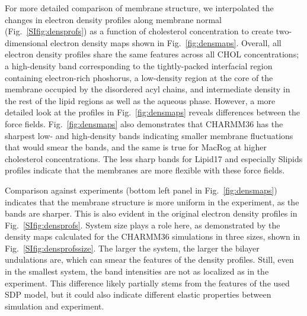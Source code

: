 \documentclass[journal=jctcce]{achemso}
\begin{document}
For more detailed comparison of membrane structure, 
we interpolated the changes in electron density profiles along membrane normal (Fig.~\ref{SIfig:densprofs}) as a function of cholesterol concentration to create two-dimensional electron density maps shown in Fig.~\ref{fig:densmaps}. 
Overall, all electron density profiles share the same features across all CHOL concentrations; a high-density band corresponding to the tightly-packed interfacial region containing electron-rich phoshorus, a low-density region at the core of the membrane occupied by the disordered acyl chains, and intermediate density in the rest of the lipid regions as well as the aqueous phase. However, a more detailed look at the profiles in Fig.~\ref{fig:densmaps} reveals differences between the force fields. 
Fig.~\ref{fig:densmaps} also demonstrates that CHARMM36 has the sharpest low- and high-density bands indicating smaller membrane fluctuations that would smear the bands, and the same is true for MacRog at higher cholesterol concentrations. The less sharp bands for Lipid17 and especially Slipids profiles indicate that the membranes are more flexible with these force fields.

Comparison against experiments (bottom left panel in Fig.~\ref{fig:densmaps}) indicates that the membrane structure is more uniform in the experiment, as the bands are sharper. This is also evident in the original electron density profiles in Fig.~\ref{SIfig:densprofs}. System size plays a role here, as demonstrated by the density maps calculated for the CHARMM36 simulations in three sizes, shown in Fig.~\ref{SIfig:densprofssize}. The larger the system, the larger the bilayer undulations are, which can smear the features of the density profiles. Still, even in the smallest system, the band intensities are not as localized as in the experiment. This difference likely partially stems from the features of the used SDP model, but it could also indicate different elastic properties between simulation and experiment.
\end{document}
